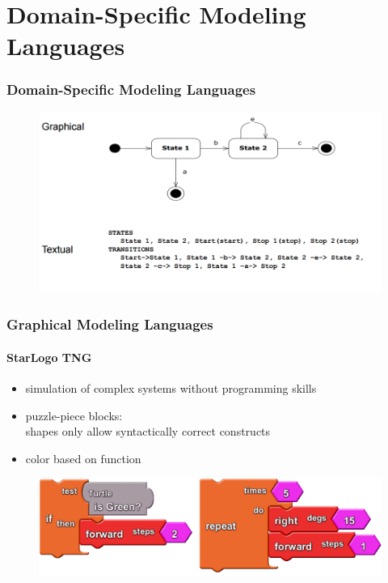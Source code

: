 \documentclass[11 pt,t]{beamer}
\begin{document}
\section{Domain-Specific Modeling Languages}

\begin{frame}
\vspace{.5cm}
  \frametitle{Domain-Specific Modeling Languages}
    \begin{figure}[H]
      \centering
      \includegraphics[width=\textwidth]{images/GraficalTextualComparison.PNG}
      \label{compare:textgraphiclang}
    \end{figure}
\end{frame}


\begin{frame}
\vspace{.5cm}
  \frametitle{Graphical Modeling Languages}
  \framesubtitle{StarLogo TNG}
  \begin{itemize}
   \item simulation of complex systems without programming skills
   \item puzzle-piece blocks: 
	\\shapes only allow syntactically correct constructs
   \item color based on function
  \end{itemize}
  
  \begin{figure}[hbtp]
	\centering
  \includegraphics[width=\textwidth]{images/StarLogoTNGBlocksEx.PNG}
	\label{fig1}
  \end{figure}
\end{frame}
\end{document}
